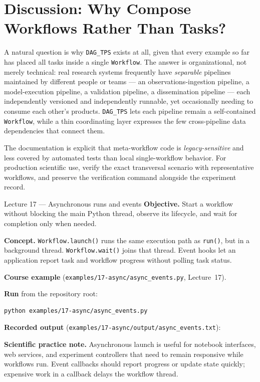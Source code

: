 \section{Discussion: Why Compose Workflows Rather Than Tasks?}

A natural question is why \texttt{DAG\_TPS} exists at all, given that every
example so far has placed all tasks inside a single \texttt{Workflow}.
The answer is organizational, not merely technical: real research systems
frequently have \emph{separable} pipelines maintained by different people or
teams --- an observations-ingestion pipeline, a model-execution pipeline, a
validation pipeline, a dissemination pipeline --- each independently
versioned and independently runnable, yet occasionally needing to consume
each other's products. \texttt{DAG\_TPS} lets each pipeline remain a
self-contained \texttt{Workflow}, while a thin coordinating layer expresses
the few cross-pipeline data dependencies that connect them.

\begin{cautionbox}
The documentation is explicit that meta-workflow code is \emph{legacy-sensitive}
and less covered by automated tests than local single-workflow behavior. For
production scientific use, verify the exact transversal scenario with
representative workflows, and preserve the verification command alongside
the experiment record.
\end{cautionbox}

\begin{lessonbox}{Lecture 17 --- Asynchronous runs and events}
\textbf{Objective.} Start a workflow without blocking the main Python thread,
observe its lifecycle, and wait for completion only when needed.

\textbf{Concept.} \texttt{Workflow.launch()} runs the same execution path as
\texttt{run()}, but in a background thread. \texttt{Workflow.wait()} joins
that thread. Event hooks let an application report task and workflow
progress without polling task status.

\textbf{Course example} (\texttt{examples/17-async/async\_events.py}, Lecture~17).


\textbf{Run} from the repository root:
\begin{lstlisting}[style=bash]
python examples/17-async/async_events.py
\end{lstlisting}

\textbf{Recorded output} (\texttt{examples/17-async/output/async\_events.txt}):


\textbf{Scientific practice note.} Asynchronous launch is useful for notebook
interfaces, web services, and experiment controllers that need to remain
responsive while workflows run. Event callbacks should report progress or
update state quickly; expensive work in a callback delays the workflow
thread.
\end{lessonbox}

